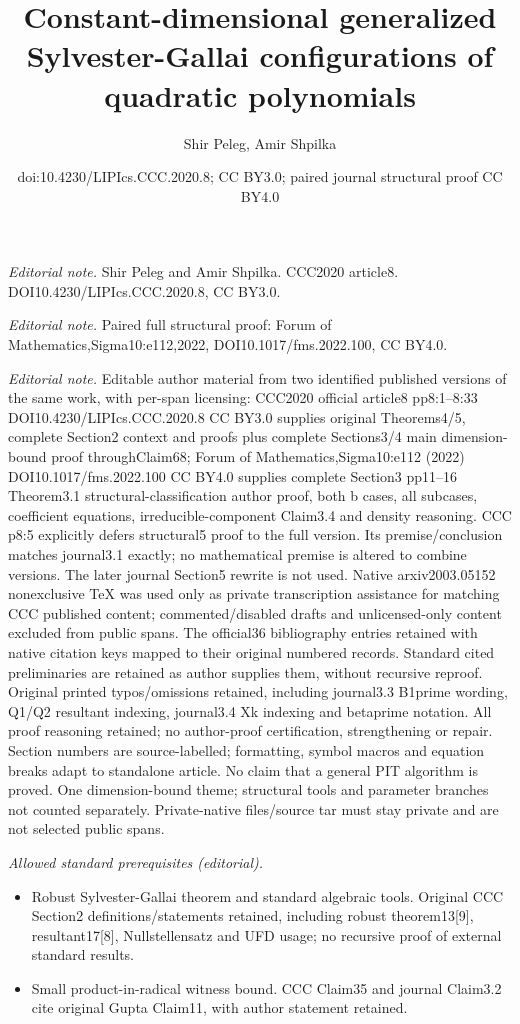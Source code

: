 \documentclass[10pt,a4paper]{article}
\title{Constant-dimensional generalized Sylvester-Gallai configurations of quadratic polynomials}
\author{Shir Peleg, Amir Shpilka}
\date{doi:10.4230/LIPIcs.CCC.2020.8; CC BY3.0; paired journal structural proof CC BY4.0}
\begin{document}
\maketitle
\noindent\textit{Editorial note.} Shir Peleg and Amir Shpilka. CCC2020 article8. DOI10.4230/LIPIcs.CCC.2020.8, CC BY3.0.\par\medskip
\noindent\textit{Editorial note.} Paired full structural proof: Forum of Mathematics,Sigma10:e112,2022, DOI10.1017/fms.2022.100, CC BY4.0.\par\medskip
\noindent\textit{Editorial note.} Editable author material from two identified published versions of the same work, with per-span licensing: CCC2020 official article8 pp8:1--8:33 DOI10.4230/LIPIcs.CCC.2020.8 CC BY3.0 supplies original Theorems4/5, complete Section2 context and proofs plus complete Sections3/4 main dimension-bound proof throughClaim68; Forum of Mathematics,Sigma10:e112 (2022) DOI10.1017/fms.2022.100 CC BY4.0 supplies complete Section3 pp11--16 Theorem3.1 structural-classification author proof, both b cases, all subcases, coefficient equations, irreducible-component Claim3.4 and density reasoning. CCC p8:5 explicitly defers structural5 proof to the full version. Its premise/conclusion matches journal3.1 exactly; no mathematical premise is altered to combine versions. The later journal Section5 rewrite is not used. Native arxiv2003.05152 nonexclusive TeX was used only as private transcription assistance for matching CCC published content; commented/disabled drafts and unlicensed-only content excluded from public spans. The official36 bibliography entries retained with native citation keys mapped to their original numbered records. Standard cited preliminaries are retained as author supplies them, without recursive reproof. Original printed typos/omissions retained, including journal3.3 B1prime wording, Q1/Q2 resultant indexing, journal3.4 Xk indexing and betaprime notation. All proof reasoning retained; no author-proof certification, strengthening or repair. Section numbers are source-labelled; formatting, symbol macros and equation breaks adapt to standalone article. No claim that a general PIT algorithm is proved. One dimension-bound theme; structural tools and parameter branches not counted separately. Private-native files/source tar must stay private and are not selected public spans.\par\medskip
\noindent\textit{Allowed standard prerequisites (editorial).}\begin{itemize}
\item Robust Sylvester-Gallai theorem and standard algebraic tools. Original CCC Section2 definitions/statements retained, including robust theorem13[9], resultant17[8], Nullstellensatz and UFD usage; no recursive proof of external standard results.
\item Small product-in-radical witness bound. CCC Claim35 and journal Claim3.2 cite original Gupta Claim11, with author statement retained.
\end{itemize}\medskip
\end{document}
